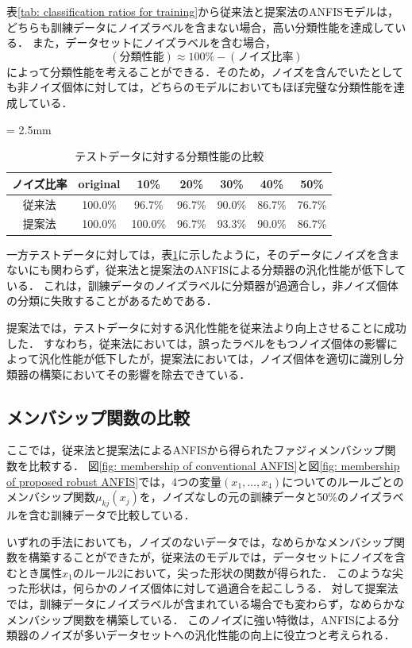 \documentclass{ujarticle}
\begin{document}
表\ref{tab: classification ratios for training}から従来法と提案法のANFISモデルは，どちらも訓練データにノイズラベルを含まない場合，高い分類性能を達成している．
また，データセットにノイズラベルを含む場合，
\[(分類性能)\approx 100\%-(ノイズ比率)\]
によって分類性能を考えることができる．そのため，ノイズを含んでいたとしても非ノイズ個体に対しては，どちらのモデルにおいてもほぼ完璧な分類性能を達成している．

\begin{table}[!htbp]
\caption{テストデータに対する分類性能の比較}
\label{tab: classification ratios for test}
\centering
{\tabcolsep = 2.5mm
\begin{tabular}{c||c|c|c|c|c|c}\hline%
ノイズ比率	& original& 10\% & 20\%	& 30\% 	& 40\% & 50\%    \\\hline\hline
従来法 & 100.0\% & 96.7\% & 96.7\% & 90.0\% & 86.7\% & 76.7\%    \\\hline
提案法 & 100.0\% & 100.0\% & 96.7\% & 93.3\% & 90.0\% & 86.7\%	 \\\hline
\end{tabular}
}
\end{table}

一方テストデータに対しては，表\ref{tab: classification ratios for test}に示したように，そのデータにノイズを含まないにも関わらず，従来法と提案法のANFISによる分類器の汎化性能が低下している．
これは，訓練データのノイズラベルに分類器が過適合し，非ノイズ個体の分類に失敗することがあるためである．

提案法では，テストデータに対する汎化性能を従来法より向上させることに成功した．
すなわち，従来法においては，誤ったラベルをもつノイズ個体の影響によって汎化性能が低下したが，提案法においては，ノイズ個体を適切に識別し分類器の構築においてその影響を除去できている．

\subsection{メンバシップ関数の比較}

ここでは，従来法と提案法によるANFISから得られたファジィメンバシップ関数を比較する．
図\ref{fig: membership of conventional ANFIS}と図\ref{fig: membership of proposed robust ANFIS}では，4つの変量$(x_1, \dots, x_4)$についてのルールごとのメンバシップ関数$\mu_{kj} (x_{j})$を，ノイズなしの元の訓練データと50\%のノイズラベルを含む訓練データで比較している．

いずれの手法においても，ノイズのないデータでは，なめらかなメンバシップ関数を構築することができたが，従来法のモデルでは，データセットにノイズを含むとき属性$x_1$のルール2において，尖った形状の関数が得られた．
このような尖った形状は，何らかのノイズ個体に対して過適合を起こしうる．
対して提案法では，訓練データにノイズラベルが含まれている場合でも変わらず，なめらかなメンバシップ関数を構築している．
このノイズに強い特徴は，ANFISによる分類器のノイズが多いデータセットへの汎化性能の向上に役立つと考えられる．
\end{document}
